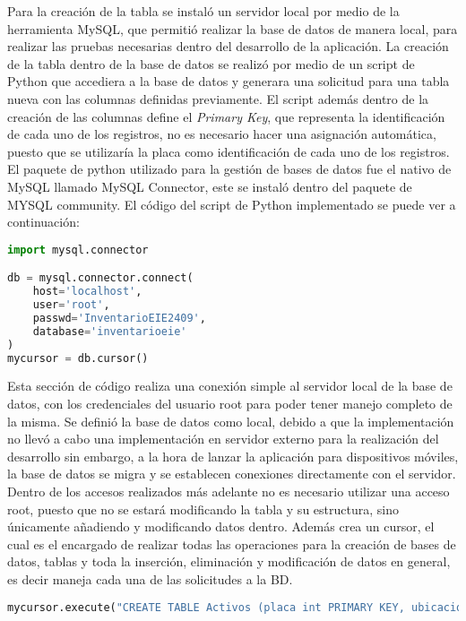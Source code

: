 \par
Para la creación de la tabla se instaló un servidor local por medio de la herramienta MySQL, que permitió realizar la base de datos de manera local, para realizar las pruebas necesarias dentro del desarrollo de la aplicación. La creación de la tabla dentro de la base de datos se realizó por medio de un script de Python que accediera a la base de datos y generara una solicitud para una tabla nueva con las columnas definidas previamente. El script además dentro de la creación de las columnas define el \textit{Primary Key}, que representa la identificación de cada uno de los registros, no es necesario hacer una asignación automática, puesto que se utilizaría la placa como identificación de cada uno de los registros. El paquete de python utilizado para la gestión de bases de datos fue el nativo de MySQL llamado MySQL Connector, este se instaló dentro del paquete de MYSQL community. El código del script de Python implementado se puede ver a continuación:
\newpage
\begin{lstlisting}[language=Python,frame=single,caption= Script de python para la conexión a una base de datos (creación propia), inputencoding=latin1]
import mysql.connector

db = mysql.connector.connect(
    host='localhost',
    user='root',
    passwd='InventarioEIE2409',
    database='inventarioeie'
)
mycursor = db.cursor()
\end{lstlisting}
\par
Esta sección de código realiza una conexión simple al servidor local de la base de datos, con los credenciales del usuario root para poder tener manejo completo de la misma. Se definió la base de datos como local, debido a que la implementación no llevó a cabo una implementación en servidor externo para la realización del desarrollo sin embargo, a la hora de lanzar la aplicación para dispositivos móviles, la base de datos se migra y se establecen conexiones directamente con el servidor. Dentro de los accesos realizados más adelante no es necesario utilizar una acceso root, puesto que no se estará modificando la tabla y su estructura, sino únicamente añadiendo y modificando datos dentro. Además crea un cursor, el cual es el encargado de realizar todas las operaciones para la creación de bases de datos, tablas y toda la inserción, eliminación y modificación de datos en general, es decir maneja cada una de las solicitudes a la BD. 
\begin{lstlisting}[language=Python,frame=single,caption= Script de python para la creación de una tabla en una base de datos (creación propia), inputencoding=latin1]
mycursor.execute("CREATE TABLE Activos (placa int PRIMARY KEY, ubicacion TEXT(65535), tipo_de_activo TEXT(65535), descripcion TEXT(65535))")
\end{lstlisting}
